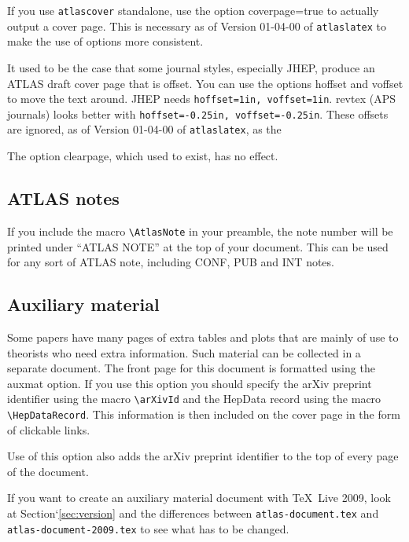 \documentclass[atlasstyle,UKenglish]{latex/atlasdoc}
\newcommand{\File}[1]{\texttt{#1}\xspace}
\newcommand{\Macro}[1]{\texttt{\textbackslash #1}\xspace}
\newcommand{\Option}[1]{\textsf{#1}\xspace}
\newcommand{\Package}[1]{\texttt{#1}\xspace}
\begin{document}
If you use \Package{atlascover} standalone, use the option \Option{coverpage=true} to
actually output a cover page. 
This is necessary as of Version 01-04-00 of \Package{atlaslatex} to make the use of options more consistent.

It used to be the case that some journal styles, especially JHEP,
produce an ATLAS draft cover page that is offset.
You can use the options \Option{hoffset} and \Option{voffset} to move the text around.
JHEP needs \verb|hoffset=1in, voffset=1in|.
revtex (APS journals) looks better with  \verb|hoffset=-0.25in, voffset=-0.25in|.
These offsets are ignored, as of Version 01-04-00 of \Package{atlaslatex}, as the

The option \Option{clearpage}, which used to exist, has no effect.

\subsection{ATLAS notes}
\label{sec:note}

If you include the macro \Macro{AtlasNote} in your preamble,
the note number will be printed under ``ATLAS NOTE'' at the top of your document.
This can be used for any sort of ATLAS note, including CONF, PUB and INT notes.


\subsection{Auxiliary material}
\label{sec:auxmat}

Some papers have many pages of extra tables and plots that are mainly of use to theorists
who need extra information.
Such material can be collected in a separate document.
The front page for this document is formatted using the \Option{auxmat} option.
If you use this option you should specify the arXiv preprint identifier
using the macro \Macro{arXivId} and the HepData record using the macro
\Macro{HepDataRecord}.
This information is then included on the cover page in the form of clickable links.

Use of this option also adds the arXiv preprint identifier to the top of every page
of the document.

If you want to create an auxiliary material document with \TeX\ Live 2009, look
at Section`\ref{sec:version} and the differences between
\File{atlas-document.tex} and \File{atlas-document-2009.tex} to see what has to be changed.
\end{document}
